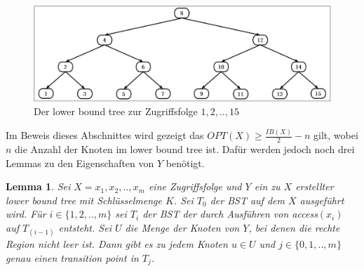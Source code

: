 \documentclass[a4paper,12pt]{article}
\newtheorem{Lemma}{Lemma}[section]
\begin{document}
\begin{figure}[H]
	\centering
	\includegraphics[width=1\textwidth]{"Medien/Tango/lowerBoundTree"}
	\caption{Der lower bound tree zur Zugriffsfolge $1 ,2, .., 15$  }
	\label{fig:demlowerBoundTree}
\end{figure}

\noindent Im Beweis dieses Abschnittes wird gezeigt das $\mathit{OPT}\left(X\right) \geq \frac{\mathit{IB}\left(X\right)}{2} - n$ gilt, wobei $n$ die Anzahl der Knoten im lower bound tree ist. Dafür werden jedoch noch drei Lemmas zu den Eigenschaften von $Y$ benötigt. 

\begin{Lemma} \label{demaineLemma1}
	Sei $X = x_1,x_2,..,x_m$ eine Zugriffsfolge und $Y$ ein zu $X$ erstellter lower bound tree mit Schlüsselmenge $K$. Sei $T_0$ der BST auf dem $X$ ausgeführt wird. Für $i \in \{1,2,..,m\}$ sei $T_i$ der BST der durch Ausführen von \textit{access}$\left(x_i\right)$ auf $T_{\left(i-1\right)}$ entsteht. Sei $U$ die Menge der Knoten von $Y$, bei denen die rechte Region nicht leer ist. Dann gibt es zu jedem Knoten $u \in U$ und $j \in \{0,1,..,m\}$ genau einen transition point in $T_j$. 	
\end{Lemma}
\end{document}
